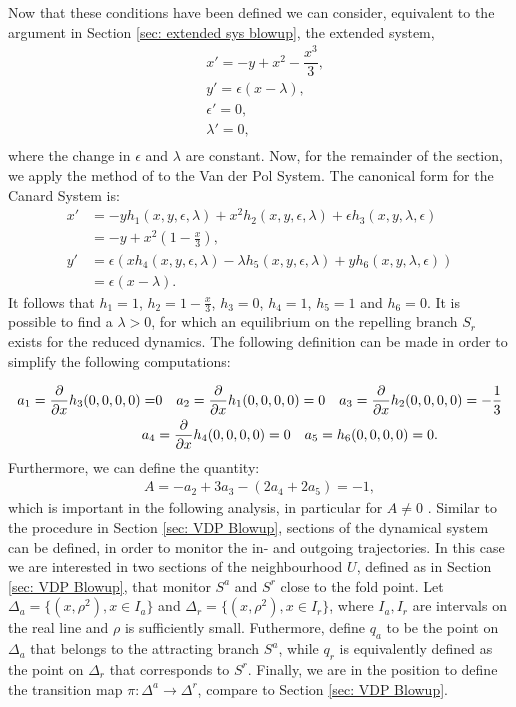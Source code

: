 Now that these conditions have been defined we can consider, equivalent to the argument in Section \ref{sec: extended sys blowup}, the extended \vdp system,
\begin{equation}
\begin{aligned}
&x'=-y+x^2-\dfrac{x^3}{3},\\
&y'=\epsilon(x-\lambda),\\
&\epsilon'=0,\\
&\lambda'=0,\\
\end{aligned}
\label{eq: canard system}
\end{equation}
where the change in $\epsilon$ and $\lambda$ are constant. 
Now, for the remainder of the section, we apply the method of \citet{krupa2001} to the Van der Pol System. The canonical form for the Canard System is:
\begin{equation} \label{canardysy2var}
	\begin{aligned}
		x'&=-yh_1(x,y,\epsilon,\lambda)+x^2h_2(x,y,\epsilon,\lambda) + \epsilon h_3(x,y,\lambda,\epsilon)\\
                        &= -y + x^2 \left( 1- \frac{x}{3} \right),\\
		y'&=\epsilon(xh_4(x,y,\epsilon,\lambda)-\lambda h_5(x,y,\epsilon,\lambda) + y h_6(x,y,\lambda,\epsilon)) \\
                        &= \epsilon( x- \lambda).
	\end{aligned}
\end{equation}
It follows that $h_1 = 1$, $h_2 = 1-\frac{x}{3}$, $h_3=0$, $h_4 =1$, $h_5=1$ and $h_6=0$.
It is possible to find a $\lambda>0$, for which an equilibrium on the repelling branch $S_r$ exists for the reduced dynamics.
The following definition can be made in order to simplify the following computations:

\begin{align*}
a_1=\pd{}{x}h_3(0,0,0,0)=& 0 \ \ \
a_2=\pd{}{x}h_1(0,0,0,0)= 0\ \ \ 
a_3=\pd{}{x}h_2(0,0,0,0)=-\frac{1}{3}\\
a_4&=\pd{}{x}h_4(0,0,0,0)=0\ \ \
a_5=h_6(0,0,0,0)=0.
\end{align*}
Furthermore, we can define the quantity:
\begin{align*}
A=-a_2+3a_3-(2a_4+2a_5)=-1,
\end{align*}
which is important in the following analysis, in particular for $A \neq 0$ \citep{krupa2001}. 
Similar to the procedure in Section \ref{sec: VDP Blowup}, sections of the dynamical system can be defined, in order to monitor the in- and outgoing trajectories. In this case we are interested in two sections of the neighbourhood $U$, defined as in Section \ref{sec: VDP Blowup}, that monitor $S^a$ and $S^r$ close to the fold point.
Let $ \Delta_a = \{ (x,\rho^2), x \in  I_a \}$ and $\Delta_r= \{ (x,\rho^2), x \in  I_r \}$, where $I_a,I_r$ are intervals on the real line and $\rho$ is sufficiently small.
Futhermore, define $q_a$ to be the point on $\Delta_a$ that belongs to the attracting branch $S^a$, while $q_r$ is equivalently defined as the point on $\Delta_r$ that corresponds to $S^r$.
Finally, we are in the position to define the transition map $\pi: \Delta^a \to \Delta^r$, compare to Section \ref{sec: VDP Blowup}.

